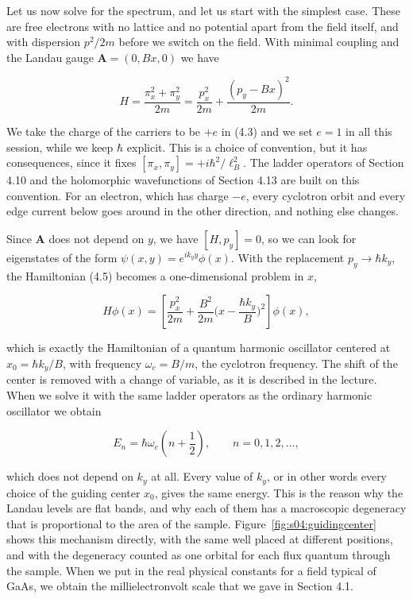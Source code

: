 Let us now solve for the spectrum, and let us start with the simplest case. These are free
electrons with no lattice and no potential apart from the field itself, and with dispersion
$p^2/2m$ before we switch on the field. With minimal coupling and the Landau gauge
$\mathbf{A}=(0,Bx,0)$ we have

\begin{equation}
H = \frac{\pi_x^2+\pi_y^2}{2m} = \frac{p_x^2}{2m} + \frac{(p_y-Bx)^2}{2m}.
\end{equation}

We take the charge of the carriers to be $+e$ in (4.3) and we set $e=1$ in all this session, while we keep $\hbar$ explicit.
This is a choice of convention, but it has consequences, since it fixes
$[\pi_x,\pi_y]=+i\hbar^2/\ell_B^2$. The ladder operators of Section 4.10 and the holomorphic
wavefunctions of Section 4.13 are built on this convention. For an electron, which has charge
$-e$, every cyclotron orbit and every edge current below goes around in the other direction, and
nothing else changes.

Since $\mathbf{A}$ does not depend on $y$, we have $[H,p_y]=0$, so we can look for eigenstates of
the form $\psi(x,y) = e^{ik_y y}\phi(x)$. With the replacement $p_y\to\hbar k_y$, the Hamiltonian
(4.5) becomes a one-dimensional problem in $x$,

\begin{equation*}
H\phi(x) = \left[\frac{p_x^2}{2m} + \frac{B^2}{2m}\Big(x-\frac{\hbar k_y}{B}\Big)^2\right]\phi(x),
\end{equation*}

which is exactly the Hamiltonian of a quantum harmonic oscillator centered at $x_0 = \hbar
k_y/B$, with frequency $\omega_c = B/m$, the cyclotron frequency. The shift of the center is
removed with a change of variable, as it is described in the lecture. When we solve it with the
same ladder operators as the ordinary harmonic oscillator we obtain

\begin{equation}
E_n = \hbar\omega_c\left(n+\frac{1}{2}\right), \qquad n=0,1,2,\dots,
\end{equation}

which does not depend on $k_y$ at all. Every value of $k_y$, or in other words every choice of the
guiding center $x_0$, gives the same energy. This is the reason why the Landau levels are flat
bands, and why each of them has a macroscopic degeneracy that is proportional to the area of the
sample. Figure~\ref{fig:s04:guidingcenter} shows this mechanism directly, with the same well placed
at different positions, and with the degeneracy counted as one orbital for each flux quantum
through the sample. When we put in the real physical constants for a field typical of GaAs, we
obtain the millielectronvolt scale that we gave in Section 4.1.

